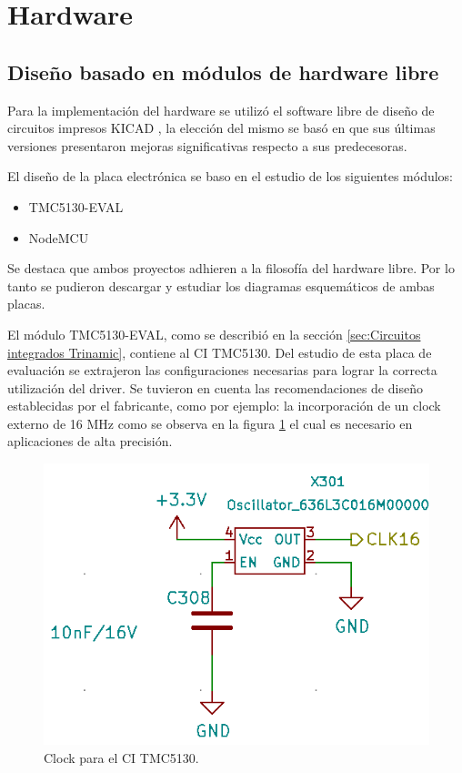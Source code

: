 \section{Hardware}
\subsection{Diseño basado en módulos de hardware libre}
\label{subsection:Diseño basado en módulos de hardware libre}

Para la implementación del hardware se utilizó el software libre de diseño de circuitos impresos KICAD \citep{web_kicad}, la elección del mismo se basó en que sus últimas versiones presentaron mejoras significativas respecto a sus predecesoras.

El diseño de la placa electrónica se baso en el estudio de los siguientes módulos:
\begin{itemize}
\item TMC5130-EVAL \citep{3_web_trinamic_placa}	
\item NodeMCU \citep{web_nodemcu}
\end{itemize}
Se destaca que ambos proyectos adhieren a la filosofía del hardware libre. Por lo tanto se pudieron descargar y estudiar los diagramas esquemáticos de ambas placas. 

El módulo TMC5130-EVAL, como se describió en la sección \ref{sec:Circuitos integrados Trinamic}, contiene al CI TMC5130. Del estudio de esta placa de evaluación se extrajeron las configuraciones necesarias para lograr la correcta utilización del driver. Se tuvieron en cuenta las recomendaciones de diseño establecidas por el fabricante, como por ejemplo: la incorporación de un clock externo de 16 MHz como se observa en la figura \ref{fig:kicad_clock} el cual es necesario en aplicaciones de alta precisión. 

\begin{figure}[h]
	\centering
	\includegraphics[width=.5\textwidth]{./Figures/kicad_clock.png}
	\caption{Clock para el CI TMC5130.}
	\label{fig:kicad_clock}
\end{figure}

